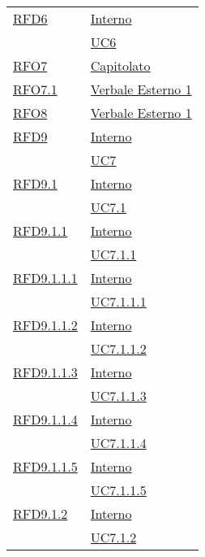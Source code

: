 \begin{longtable}{|>{\centering}m{5cm}|m{5cm}<{\centering}|}
\hyperlink{RFD6}{RFD6} & \hyperlink{Interno}{Interno}\\
& \hyperref[UC6]{UC6}\\ \hline

\hyperlink{RFO7}{RFO7} & \hyperlink{Capitolato}{Capitolato}\\ \hline

\hyperlink{RFO7.1}{RFO7.1} & \hyperlink{Verbale Esterno 1}{Verbale Esterno 1}\\ \hline

\hyperlink{RFO8}{RFO8} & \hyperlink{Verbale Esterno 1}{Verbale Esterno 1}\\ \hline

\hyperlink{RFD9}{RFD9} & \hyperlink{Interno}{Interno}\\
& \hyperref[UC7]{UC7}\\ \hline

\hyperlink{RFD9.1}{RFD9.1} & \hyperlink{Interno}{Interno}\\
& \hyperref[UC7.1]{UC7.1}\\ \hline

\hyperlink{RFD9.1.1}{RFD9.1.1} & \hyperlink{Interno}{Interno}\\
& \hyperref[UC7.1.1]{UC7.1.1}\\ \hline

\hyperlink{RFD9.1.1.1}{RFD9.1.1.1} & \hyperlink{Interno}{Interno}\\
& \hyperref[UC7.1.1.1]{UC7.1.1.1}\\ \hline

\hyperlink{RFD9.1.1.2}{RFD9.1.1.2} & \hyperlink{Interno}{Interno}\\
& \hyperref[UC7.1.1.2]{UC7.1.1.2}\\ \hline

\hyperlink{RFD9.1.1.3}{RFD9.1.1.3} & \hyperlink{Interno}{Interno}\\
& \hyperref[UC7.1.1.3]{UC7.1.1.3}\\ \hline

\hyperlink{RFD9.1.1.4}{RFD9.1.1.4} & \hyperlink{Interno}{Interno}\\
& \hyperref[UC7.1.1.4]{UC7.1.1.4}\\ \hline

\hyperlink{RFD9.1.1.5}{RFD9.1.1.5} & \hyperlink{Interno}{Interno}\\
& \hyperref[UC7.1.1.5]{UC7.1.1.5}\\ \hline

\hyperlink{RFD9.1.2}{RFD9.1.2} & \hyperlink{Interno}{Interno}\\
& \hyperref[UC7.1.2]{UC7.1.2}\\ \hline


\end{longtable}
